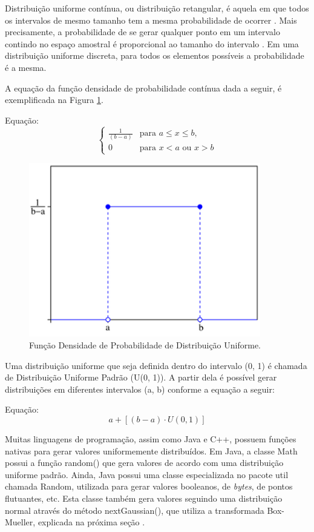 Distribuição uniforme contínua, ou distribuição retangular, é aquela em que todos os intervalos de mesmo tamanho tem a mesma probabilidade de ocorrer \cite{wikidistuniform1}. Mais precisamente, a probabilidade de se gerar qualquer ponto em um intervalo contindo no espaço amostral é proporcional ao tamanho do intervalo \cite{wikidistuniform2}. Em uma distribuição uniforme discreta, para todos os elementos possíveis a probabilidade é a mesma.

A equação da função densidade de probabilidade contínua dada a seguir, é exemplificada na Figura \ref{fig:uniformdist}.

Equação: \[\left\{\begin{matrix}
\frac{1}{(b-a)} & \mbox{para } a \leqslant x \leqslant b,\\ 
0 & \mbox{para } x < a \mbox{ ou } x > b
\end{matrix}\right.\]

\begin{figure}[!htb]
	\centering
	\includegraphics[width=0.9\textwidth]{./imgs/uniformdist.png}
	\caption{Função Densidade de Probabilidade de Distribuição Uniforme.}
	\label{fig:uniformdist}
\end{figure}

Uma distribuição uniforme que seja definida dentro do intervalo (0, 1) é chamada de Distribuição Uniforme Padrão (U(0, 1)). A partir dela é possível gerar distribuições em diferentes intervalos (a, b) conforme a equação a seguir:

Equação: \[a+[(b-a) \cdot U(0, 1)]\]

Muitas linguagens de programação, assim como Java e C++, possuem funções nativas para gerar valores uniformemente distribuídos. Em Java, a classe Math possui a função random() que gera valores de acordo com uma distribuição uniforme padrão. Ainda, Java possui uma classe especializada no pacote util chamada Random, utilizada para gerar valores booleanos, de \emph{bytes}, de pontos flutuantes, etc. Esta classe também gera valores seguindo uma distribuição normal através do método nextGaussian(), que utiliza a transformada Box-Mueller, explicada na próxima seção \cite{javaapi}. 


